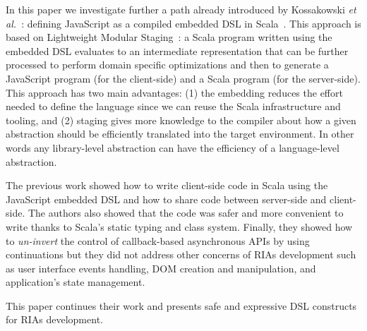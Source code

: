 \documentclass[american,english,runningheads]{llncs}
\newcommand{\etal}{\emph{et al.~}}
\begin{document}
In this paper we investigate further a path already introduced by Kossakowski \etal{}: defining JavaScript as a compiled embedded DSL in Scala~\cite{Kossakowski12_JsDESL}. This approach is based on Lightweight Modular Staging~\cite{Rompf12_LMSThesis}: a Scala program written using the embedded DSL evaluates to an intermediate representation that can be further processed to perform domain specific optimizations and then to generate a JavaScript program (for the client-side) and a Scala program (for the server-side). This approach has two main advantages: (1) the embedding reduces the effort needed to define the language since we can reuse the Scala infrastructure and tooling, and (2) staging gives more knowledge to the compiler about how a given abstraction should be efficiently translated into the target environment. In other words any library-level abstraction can have the efficiency of a language-level abstraction.

The previous work showed how to write client-side code in Scala using the JavaScript embedded DSL and how to share code between server-side and client-side. The authors also showed that the code was safer and more convenient to write thanks to Scala's static typing and class system. Finally, they showed how to \emph{un-invert} the control of callback-based asynchronous APIs by using continuations but they did not address other concerns of RIAs development such as user interface events handling, DOM creation and manipulation, and application’s state management.

This paper continues their work and presents safe and expressive DSL constructs for RIAs development.

% 
% 
% 
% 
% 
% 
\end{document}
